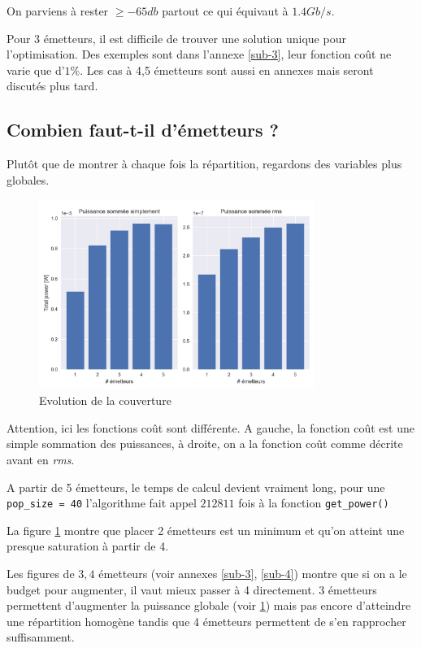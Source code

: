 \documentclass[sn-mathphys-num]{sn-jnl}%
\theoremstyle{thmstyleone}%
\theoremstyle{thmstyletwo}%
\theoremstyle{thmstylethree}%
\begin{document}
On parviens à rester $\ge -65db$ partout ce qui équivaut à $1.4 Gb/s$.

Pour 3 émetteurs, il est difficile de trouver une solution unique
pour l'optimisation. Des exemples sont dans l'annexe \ref{sub-3}, leur fonction coût
ne varie que d'$1\%$. Les cas à 4,5 émetteurs sont aussi en annexes 
mais seront discutés plus tard.

\subsection{Combien faut-t-il d’émetteurs ?}
Plutôt que de montrer à chaque fois la répartition, regardons des variables
plus globales.

\begin{figure}[H]
    \centering
    \includegraphics[width=0.8\textwidth]{images/opti/data_compare.png}
    \caption{Evolution de la couverture}
    \label{fig:datacomp}
\end{figure}

Attention, ici les fonctions coût sont différente. A gauche,
la fonction coût est une simple sommation des puissances, à droite,
on a la fonction coût comme décrite avant en \textit{rms}.

A partir de 5 émetteurs, le temps de calcul devient vraiment long,
pour une \texttt{pop\_size = 40} l'algorithme fait appel $212811$ fois à la 
fonction \texttt{get\_power()}

\begin{tcolorbox}[colback=blue!10!white,colframe=blue!50!black,title=Conclusion,sharp corners]
La figure \ref{fig:datacomp} montre que placer 2 émetteurs
est un minimum et qu'on atteint une presque saturation à partir de 4. 

Les figures de $3,4$ émetteurs (voir annexes \ref{sub-3}, \ref{sub-4}) montre que si 
on a le budget pour augmenter, il vaut mieux passer à 4 directement. 
3 émetteurs permettent d'augmenter la puissance globale (voir \ref{fig:datacomp})
mais pas encore d'atteindre une répartition homogène tandis que 4 émetteurs
permettent de s'en rapprocher suffisamment.
\end{tcolorbox}
\end{document}

